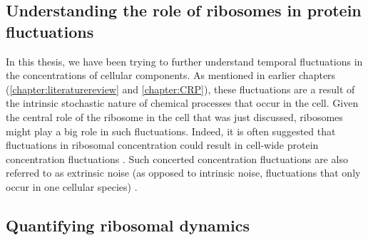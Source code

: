\subsection{Understanding the role of ribosomes in protein fluctuations}

In this thesis, 
we have been trying to further 
understand %
temporal fluctuations in the concentrations of cellular components.%
%
As mentioned in earlier chapters (\ref{chapter:literaturereview} and  \ref{chapter:CRP}),
these fluctuations are a result of the intrinsic stochastic nature of chemical processes that occur in the cell.
%
Given the central role of the ribosome in the cell that was just discussed, ribosomes might play a big role in such fluctuations.
Indeed, it is often suggested that fluctuations in ribosomal concentration could result in cell-wide protein concentration fluctuations \cite{Davidson2008, Raj2008, Chalancon2012, Bruggeman2018}.
%
Such concerted concentration fluctuations are also referred to as extrinsic noise (as opposed to intrinsic noise, fluctuations that only occur in one cellular species) \cite{Elowitz2002}.

\subsection{Quantifying ribosomal dynamics}
\label{section:ribos:walker}

